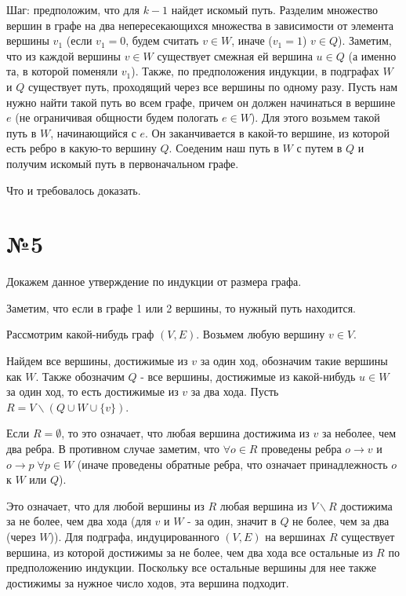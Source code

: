 \documentclass[12pt]{article}
\begin{document}
	Шаг: предположим, что для $k - 1$ найдет искомый путь. 
	Разделим множество вершин в графе на два непересекающихся множества
	в зависимости от элемента вершины $v_1$ 
	(если $v_1 = 0$, будем считать $v \in W$, иначе ($v_1=1$) $v \in Q$).
	Заметим, что из каждой вершины $v \in W$ существует смежная ей вершина $u \in Q$ (а именно та, в которой поменяли $v_1$). 
	Также, по предположения индукции, в подграфах $W$ и $Q$ существует 
	путь, проходящий через все вершины по одному разу. 
	Пусть нам нужно найти такой путь во всем графе, 
	причем он должен начинаться в вершине $e$ 
	(не ограничивая общности будем пологать $e \in W$).
	Для этого возьмем такой путь в $W$, начинающийся с $e$.
	Он заканчивается в какой-то вершине, из которой есть ребро в 
	какую-то вершину $Q$. Соеденим наш путь в $W$ с путем в $Q$ и получим искомый путь в первоначальном графе.
	
	Что и требовалось доказать.
	
	\section*{№5}
	 
	Докажем данное утверждение по индукции от размера графа.
	
	Заметим, что если в графе 1 или 2 вершины, то нужный путь находится.
	
	Рассмотрим какой-нибудь граф $(V, E)$. Возьмем любую вершину $v \in V$.
	
	Найдем все вершины, достижимые из $v$ за один ход,
	обозначим такие вершины как $W$. Также обозначим $Q$ - все вершины,
	достижимые из какой-нибудь $u \in W$ за один ход, то есть достижимые из 
	$v$ за два хода. Пусть $R = V \backslash (Q \cup W \cup \{v\})$.
	
	Если $R = \emptyset$, то это означает, что любая вершина достижима из $v$
	за неболее, чем два ребра. В противном случае заметим, что 
	$\forall o \in R$ проведены ребра $o \rightarrow v$ и 
	$o \rightarrow p \; \forall p \in W$ (иначе проведены обратные ребра,
	что означает принадлежность $o$ к $W$ или $Q$).
	
	Это означает, что для любой вершины из $R$ любая вершина из 
	$V \backslash R$ достижима за не более, чем два хода 
	(для $v$ и $W$ - за один, значит в $Q$ не более, чем за два (через $W$)).
	Для подграфа, индуцированного $(V, E)$ на вершинах $R$ существует вершина,
	из которой достижимы за не более, чем два хода все остальные из $R$ по 
	предположению индукции. Поскольку все остальные вершины для нее 
	также достижимы за нужное число ходов, эта вершина подходит. 
	
\end{document}
